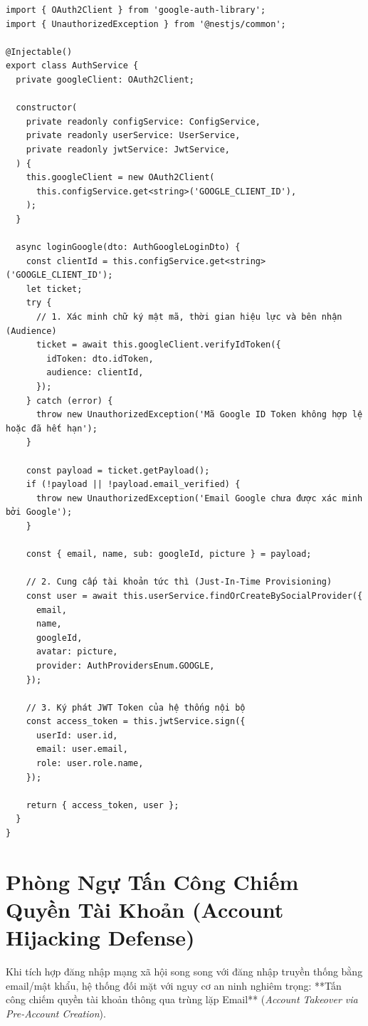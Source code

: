\documentclass[12pt,a4paper,oneside]{book}
\begin{document}
\begin{codebox}
\begin{Verbatim}[fontsize=\small]
import { OAuth2Client } from 'google-auth-library';
import { UnauthorizedException } from '@nestjs/common';

@Injectable()
export class AuthService {
  private googleClient: OAuth2Client;

  constructor(
    private readonly configService: ConfigService,
    private readonly userService: UserService,
    private readonly jwtService: JwtService,
  ) {
    this.googleClient = new OAuth2Client(
      this.configService.get<string>('GOOGLE_CLIENT_ID'),
    );
  }

  async loginGoogle(dto: AuthGoogleLoginDto) {
    const clientId = this.configService.get<string>('GOOGLE_CLIENT_ID');
    let ticket;
    try {
      // 1. Xác minh chữ ký mật mã, thời gian hiệu lực và bên nhận (Audience)
      ticket = await this.googleClient.verifyIdToken({
        idToken: dto.idToken,
        audience: clientId,
      });
    } catch (error) {
      throw new UnauthorizedException('Mã Google ID Token không hợp lệ hoặc đã hết hạn');
    }

    const payload = ticket.getPayload();
    if (!payload || !payload.email_verified) {
      throw new UnauthorizedException('Email Google chưa được xác minh bởi Google');
    }

    const { email, name, sub: googleId, picture } = payload;
    
    // 2. Cung cấp tài khoản tức thì (Just-In-Time Provisioning)
    const user = await this.userService.findOrCreateBySocialProvider({
      email,
      name,
      googleId,
      avatar: picture,
      provider: AuthProvidersEnum.GOOGLE,
    });

    // 3. Ký phát JWT Token của hệ thống nội bộ
    const access_token = this.jwtService.sign({
      userId: user.id,
      email: user.email,
      role: user.role.name,
    });

    return { access_token, user };
  }
}
\end{Verbatim}
\end{codebox}

\section{Phòng Ngự Tấn Công Chiếm Quyền Tài Khoản (Account Hijacking Defense)}
Khi tích hợp đăng nhập mạng xã hội song song với đăng nhập truyền thống bằng email/mật khẩu, hệ thống đối mặt với nguy cơ an ninh nghiêm trọng: **Tấn công chiếm quyền tài khoản thông qua trùng lặp Email** (\textit{Account Takeover via Pre-Account Creation}).
\end{document}
